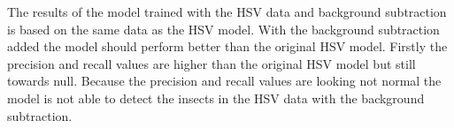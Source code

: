 The results of the model trained with the HSV data and background subtraction is based on the same data as the HSV model. With the background subtraction added the model should perform better than the original HSV model. Firstly the precision and recall values are higher than the original HSV model but still towards null. Because the precision and recall values are looking not normal the model is not able to detect the insects in the HSV data with the background subtraction.

